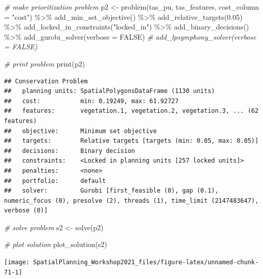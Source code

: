 \documentclass[
  12pt,
]{book}
\newenvironment{Shaded}{\begin{snugshade}}{\end{snugshade}}
\newcommand{\AttributeTok}[1]{\textcolor[rgb]{0.77,0.63,0.00}{#1}}
\newcommand{\CommentTok}[1]{\textcolor[rgb]{0.56,0.35,0.01}{\textit{#1}}}
\newcommand{\ConstantTok}[1]{\textcolor[rgb]{0.00,0.00,0.00}{#1}}
\newcommand{\FloatTok}[1]{\textcolor[rgb]{0.00,0.00,0.81}{#1}}
\newcommand{\FunctionTok}[1]{\textcolor[rgb]{0.00,0.00,0.00}{#1}}
\newcommand{\NormalTok}[1]{#1}
\newcommand{\OtherTok}[1]{\textcolor[rgb]{0.56,0.35,0.01}{#1}}
\newcommand{\SpecialCharTok}[1]{\textcolor[rgb]{0.00,0.00,0.00}{#1}}
\newcommand{\StringTok}[1]{\textcolor[rgb]{0.31,0.60,0.02}{#1}}
\begin{document}
\begin{Shaded}
\begin{Highlighting}[]
\CommentTok{\# make prioritization problem}
\NormalTok{p2 }\OtherTok{\textless{}{-}} \FunctionTok{problem}\NormalTok{(tas\_pu, tas\_features, }\AttributeTok{cost\_column =} \StringTok{"cost"}\NormalTok{) }\SpecialCharTok{\%\textgreater{}\%}
      \FunctionTok{add\_min\_set\_objective}\NormalTok{() }\SpecialCharTok{\%\textgreater{}\%}
      \FunctionTok{add\_relative\_targets}\NormalTok{(}\FloatTok{0.05}\NormalTok{) }\SpecialCharTok{\%\textgreater{}\%}
      \FunctionTok{add\_locked\_in\_constraints}\NormalTok{(}\StringTok{"locked\_in"}\NormalTok{) }\SpecialCharTok{\%\textgreater{}\%}
      \FunctionTok{add\_binary\_decisions}\NormalTok{() }\SpecialCharTok{\%\textgreater{}\%}
      \FunctionTok{add\_gurobi\_solver}\NormalTok{(}\AttributeTok{verbose =} \ConstantTok{FALSE}\NormalTok{)}
      \CommentTok{\# add\_lpsymphony\_solver(verbose = FALSE)}

\CommentTok{\# print problem}
\FunctionTok{print}\NormalTok{(p2)}
\end{Highlighting}
\end{Shaded}

\begin{verbatim}
## Conservation Problem
##   planning units: SpatialPolygonsDataFrame (1130 units)
##   cost:           min: 0.19249, max: 61.92727
##   features:       vegetation.1, vegetation.2, vegetation.3, ... (62 features)
##   objective:      Minimum set objective 
##   targets:        Relative targets [targets (min: 0.05, max: 0.05)]
##   decisions:      Binary decision 
##   constraints:    <Locked in planning units [257 locked units]>
##   penalties:      <none>
##   portfolio:      default
##   solver:         Gurobi [first_feasible (0), gap (0.1), numeric_focus (0), presolve (2), threads (1), time_limit (2147483647), verbose (0)]
\end{verbatim}

\begin{Shaded}
\begin{Highlighting}[]
\CommentTok{\# solve problem}
\NormalTok{s2 }\OtherTok{\textless{}{-}} \FunctionTok{solve}\NormalTok{(p2)}

\CommentTok{\# plot solution}
\FunctionTok{plot\_solution}\NormalTok{(s2)}
\end{Highlighting}
\end{Shaded}

\begin{center}\texttt{[image: SpatialPlanning\_Workshop2021\_files/figure-latex/unnamed-chunk-71-1]} \end{center}
\end{document}
